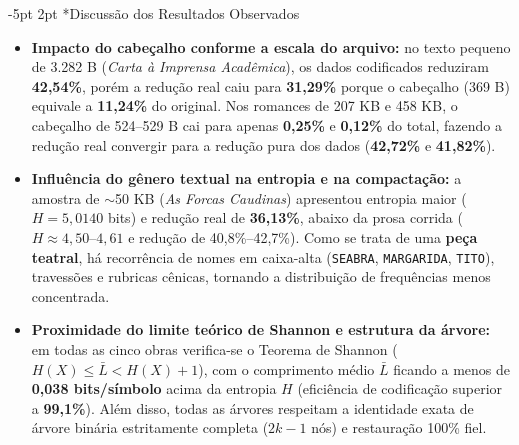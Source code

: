 \documentclass[a4paper,10pt]{article}
\makeatletter
\renewcommand\subsection{\@startsection{subsection}{2}{\z@}%
                                     {-5pt \@plus -1pt \@minus -1pt}%
                                     {2pt \@plus 1pt}%
                                     {\normalfont\normalsize\bfseries}}
\makeatother
\begin{document}
\subsection*{Discussão dos Resultados Observados}
\begin{itemize}\setlength{\itemsep}{1.4pt}\setlength{\parskip}{0pt}\setlength{\topsep}{2pt}
  \item \textbf{Impacto do cabeçalho conforme a escala do arquivo:} no texto pequeno de 3.282 B (\emph{Carta à Imprensa Acadêmica}), os dados codificados reduziram \textbf{42,54\%}, porém a redução real caiu para \textbf{31,29\%} porque o cabeçalho (369 B) equivale a \textbf{11,24\%} do original. Nos romances de 207 KB e 458 KB, o cabeçalho de 524--529 B cai para apenas \textbf{0,25\%} e \textbf{0,12\%} do total, fazendo a redução real convergir para a redução pura dos dados (\textbf{42,72\%} e \textbf{41,82\%}).
  \item \textbf{Influência do gênero textual na entropia e na compactação:} a amostra de $\sim$50 KB (\emph{As Forcas Caudinas}) apresentou entropia maior ($H = 5{,}0140$ bits) e redução real de \textbf{36,13\%}, abaixo da prosa corrida ($H \approx 4{,}50$--$4{,}61$ e redução de 40,8\%--42,7\%). Como se trata de uma \textbf{peça teatral}, há recorrência de nomes em caixa-alta (\texttt{SEABRA}, \texttt{MARGARIDA}, \texttt{TITO}), travessões e rubricas cênicas, tornando a distribuição de frequências menos concentrada.
  \item \textbf{Proximidade do limite teórico de Shannon e estrutura da árvore:} em todas as cinco obras verifica-se o Teorema de Shannon ($H(X) \le \bar{L} < H(X) + 1$), com o comprimento médio $\bar{L}$ ficando a menos de \textbf{0,038 bits/símbolo} acima da entropia $H$ (eficiência de codificação superior a \textbf{99,1\%}). Além disso, todas as árvores respeitam a identidade exata de árvore binária estritamente completa ($2k - 1$ nós) e restauração 100\% fiel.
\end{itemize}
\end{document}
